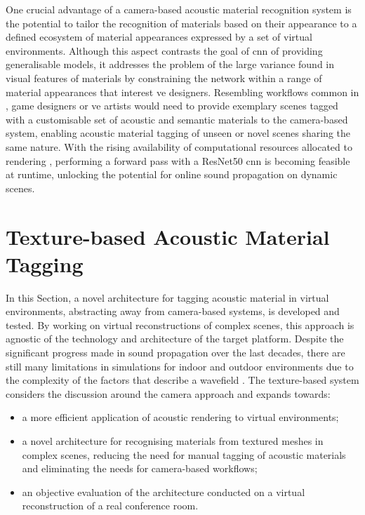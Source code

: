 One crucial advantage of a camera-based acoustic material recognition system is the potential to tailor the recognition of materials based on their appearance to a defined ecosystem of material appearances expressed by a set of virtual environments. Although this aspect contrasts the goal of \acrshort{cnn} of providing generalisable models, it addresses the problem of the large variance found in visual features of materials by constraining the network within a range of material appearances that interest \acrshort{ve} designers. Resembling workflows common in  \citep{mildenhall2020nerf}, game designers or \acrshort{ve} artists would need to provide exemplary scenes tagged with a customisable set of acoustic and semantic materials to the camera-based system, enabling acoustic material tagging of unseen or novel scenes sharing the same nature. With the rising availability of computational resources allocated to rendering , performing a forward pass with a ResNet50 \acrshort{cnn} \citep{he2016deep} is becoming feasible at runtime, unlocking the potential for online sound propagation on dynamic scenes.\par

\section{Texture-based Acoustic Material Tagging}\label{sec:texture-tagging}
In this Section, a novel architecture for tagging acoustic material in virtual environments, abstracting away from camera-based systems, is developed and tested. By working on virtual reconstructions of complex scenes, this approach is agnostic of the technology and architecture of the target platform. Despite the significant progress made in sound propagation over the last decades, there are still many limitations in simulations for indoor and outdoor environments due to the complexity of the factors that describe a wavefield \citep{liu2020sound}. The texture-based system considers the discussion around the camera approach and expands towards:
\begin{itemize}
    \item a more efficient application of acoustic rendering to virtual environments;
    \item a novel architecture for recognising materials from textured meshes in complex scenes, reducing the need for manual tagging of acoustic materials and eliminating the needs for camera-based workflows; 
    \item an objective evaluation of the architecture conducted on a virtual reconstruction of a real conference room.
\end{itemize}

